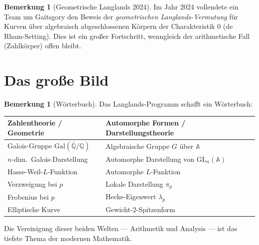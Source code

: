 \documentclass[12pt,a4paper]{amsart}
\theoremstyle{definition}
\newtheorem{remark}[theorem]{Bemerkung}
\newcommand{\Q}{\mathbb{Q}}
\newcommand{\A}{\mathbb{A}}
\newcommand{\GL}{\mathrm{GL}}
\newcommand{\GQ}{\mathrm{Gal}(\bar{\Q}/\Q)}
\begin{document}
\begin{remark}[Geometrische Langlands 2024]
Im Jahr 2024 vollendete ein Team um Gaitsgory den Beweis der
\emph{geometrischen Langlands-Vermutung} für Kurven über algebraisch
abgeschlossenen Körpern der Charakteristik 0 (de Rham-Setting).
Dies ist ein großer Fortschritt, wenngleich der arithmetische Fall
(Zahlkörper) offen bleibt.
\end{remark}

\section{Das große Bild}

\begin{remark}[Wörterbuch]
Das Langlands-Programm schafft ein Wörterbuch:
\begin{center}
\begin{tabular}{l|l}
\textbf{Zahlentheorie / Geometrie} & \textbf{Automorphe Formen / Darstellungstheorie} \\
\hline
Galois-Gruppe $\GQ$ & Algebraische Gruppe $G$ über $\A$ \\
$n$-dim.\ Galois-Darstellung & Automorphe Darstellung von $\GL_n(\A)$ \\
Hasse-Weil-$L$-Funktion & Automorphe $L$-Funktion \\
Verzweigung bei $p$ & Lokale Darstellung $\pi_p$ \\
Frobenius bei $p$ & Hecke-Eigenwert $\lambda_p$ \\
Elliptische Kurve & Gewicht-2-Spitzenform \\
\end{tabular}
\end{center}
Die Vereinigung dieser beiden Welten — Arithmetik und Analysis — ist
das tiefste Thema der modernen Mathematik.
\end{remark}
\end{document}
